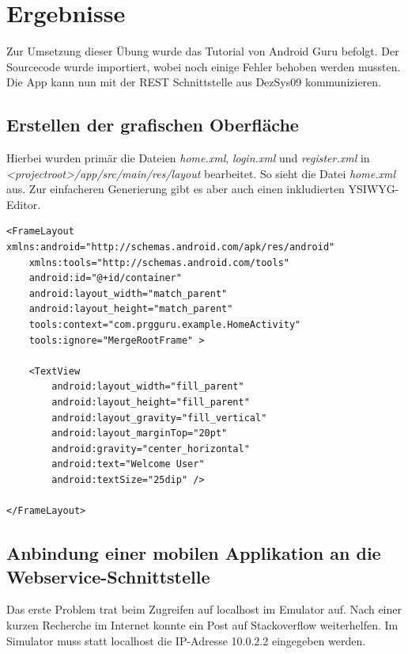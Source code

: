 
\section{Ergebnisse}
\label{sec:Ergebnisse}
Zur Umsetzung dieser Übung wurde das Tutorial von Android Guru befolgt. Der Sourcecode wurde importiert, wobei noch einige Fehler behoben werden mussten. Die App kann nun mit der REST Schnittstelle aus DezSys09 kommunizieren. \cite{GitHub-Repo09}

\subsection{Erstellen der grafischen Oberfläche}
\label{subsec:Erstellen der grafischen Oberfläche}
Hierbei wurden primär die Dateien \textit{home.xml}, \textit{login.xml} und \textit{register.xml} in\\ \textit{<projectroot>/app/src/main/res/layout} bearbeitet. So sieht die Datei \textit{home.xml} aus. Zur einfacheren Generierung gibt es aber auch einen inkludierten YSIWYG-Editor.
\begin{lstlisting}[frame=single, style=xml, caption=home.xml]
<FrameLayout xmlns:android="http://schemas.android.com/apk/res/android"
    xmlns:tools="http://schemas.android.com/tools"
    android:id="@+id/container"
    android:layout_width="match_parent"
    android:layout_height="match_parent"
    tools:context="com.prgguru.example.HomeActivity"
    tools:ignore="MergeRootFrame" >

    <TextView
        android:layout_width="fill_parent"
        android:layout_height="fill_parent"
        android:layout_gravity="fill_vertical"
        android:layout_marginTop="20pt"
        android:gravity="center_horizontal"
        android:text="Welcome User"
        android:textSize="25dip" />

</FrameLayout>
\end{lstlisting}

\subsection{Anbindung einer mobilen Applikation an die Webservice-Schnittstelle}
\label{subsec:Anbindung einer mobilen Applikation an die Webservice-Schnittstelle}
Das erste Problem trat beim Zugreifen auf localhost im Emulator auf. Nach einer kurzen Recherche im Internet konnte ein Post auf Stackoverflow weiterhelfen. \cite{AndroidLocalhost}
Im Simulator muss statt localhost die IP-Adresse 10.0.2.2 eingegeben werden.

